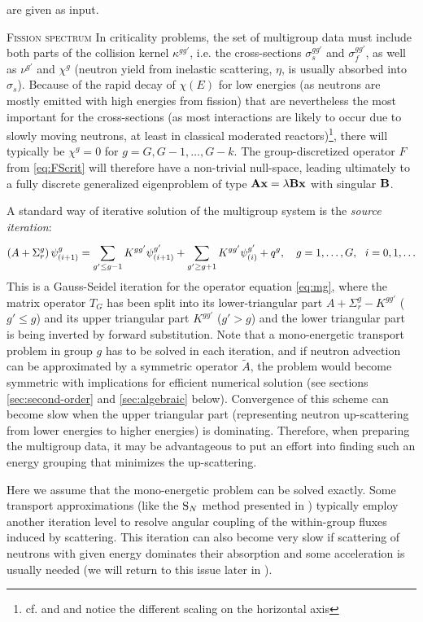 are given as input.
\begin{remark}{\textsc{Fission spectrum}}
In criticality problems, the set of multigroup data must include both parts of the collision kernel
$\kappa^{gg'}$, i.e. the cross-sections $\sigma_s^{gg'}$ and $\sigma_f^{gg'}$, as well as $\nu^{g'}$ and
$\chi^g$ (neutron yield from inelastic scattering, $\eta$, is usually absorbed into $\sigma_s$). Because of the rapid
decay of $\chi(E)$ for low energies (as neutrons are mostly emitted with high energies from fission) that are
nevertheless the most important for the cross-sections (as most interactions are likely to occur due to slowly moving
neutrons, at least in classical moderated reactors)\footnote{cf.  and  and notice the
different scaling on the horizontal axis}, there will typically be $\chi^g = 0$ for $g = G,G-1,\ldots,G-k$. The
group-discretized operator $F$ from \eqref{eq:FScrit} will therefore have a non-trivial null-space, leading ultimately
to a fully discrete generalized eigenproblem of type $\mathbf{A}\mathbf{x} = \lambda\mathbf{B}\mathbf{x}$ with singular $\mathbf{B}$.
\end{remark}

A standard way of iterative solution of the multigroup system is the \textit{source iteration}:
\begin{equation}\label{eq:MGGS}
	\left(A + \Sigma_r^g\right)\psi^g_{(i+1)} = \sum_{g'\leq g-1}^{} K^{gg'}\psi^{g'}_{(i+1)} + \sum_{g' \geq g+1}^{}
  K^{gg'}\psi^{g'}_{(i)} + q^g,\quad g = 1,\ldots,G,\ \ i = 0,1,\ldots
\end{equation}
  This is a Gauss-Seidel iteration for the operator equation \eqref{eq:mg}, where the matrix operator $T_G$ has been
split into its lower-triangular part $A + \Sigma_r^g - K^{gg'}$ ($g'\leq g$) and its upper triangular part $K^{gg'}$
($g'> g$) and the lower triangular part is being inverted by forward substitution.
Note that a mono-energetic transport problem in group $g$ has to be solved in each iteration, and if neutron advection
can be approximated by a symmetric operator $\tilde A$, the problem would become symmetric with implications for
efficient numerical solution (see sections \ref{sec:second-order} and \ref{sec:algebraic} below). Convergence of this 
scheme can become slow when the upper triangular part (representing neutron up-scattering from lower energies to 
higher energies) is dominating. Therefore, when preparing the multigroup data, it may be advantageous to put an effort
into finding such an energy grouping that minimizes the up-scattering.
\begin{remark}\label{rem:SI}
Here we assume that the
mono-energetic problem can be solved exactly. Some transport approximations (like the $\text{S}_{N}$ method presented in
) typically employ another iteration level to resolve angular coupling of the within-group fluxes
induced by scattering. This iteration can also become very slow if scattering of
neutrons with given energy dominates their absorption and some acceleration is usually needed (we will return to this
issue later in ).
\end{remark}

